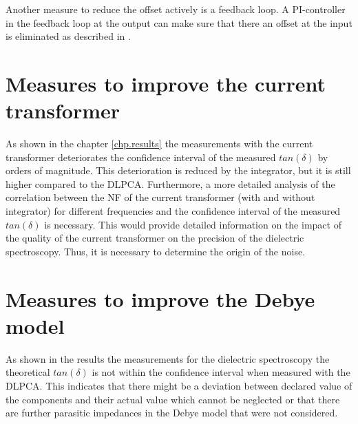 Another measure to reduce the offset actively is a feedback loop. A PI-controller in the feedback loop at the output can make sure that there an offset at the input is eliminated as described in \cite{thomas}. 

\section{Measures to improve the current transformer}
As shown in the chapter \ref{chp.results} the measurements with the current transformer deteriorates the confidence interval of the measured $tan(\delta)$ by orders of magnitude. This deterioration is reduced by the integrator, but it is still higher compared to the DLPCA. 
Furthermore, a more detailed analysis of the correlation between the NF of the current transformer (with and without integrator) for different frequencies and the confidence interval of the measured $tan(\delta)$ is necessary. This would provide detailed information on the impact of the quality of the current transformer on the precision of the dielectric spectroscopy. Thus, it is necessary to determine the origin of the noise. 


\section{Measures to improve the Debye model}
\label{debyemodel}
As shown in the results the measurements for the dielectric spectroscopy the theoretical $tan(\delta)$ is not within the confidence interval when measured with the DLPCA. This indicates that there might be a deviation between declared value of the components and their actual value which cannot be neglected or that there are further parasitic impedances in the Debye model that were not considered. 


